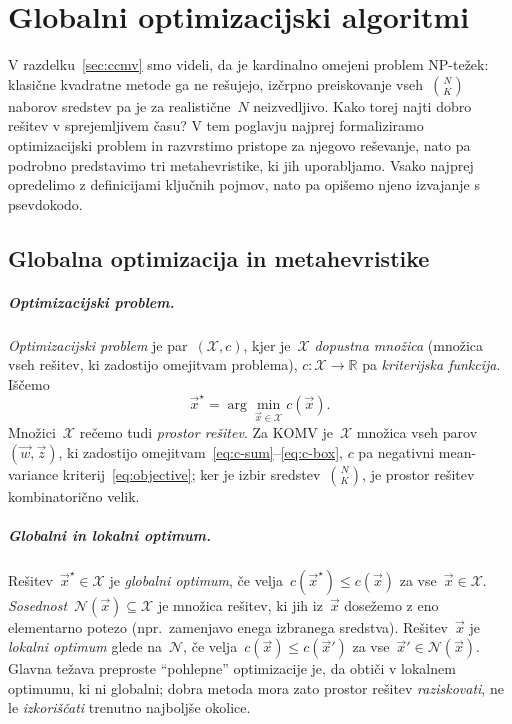 \chapter{Globalni optimizacijski algoritmi}
\label{ch:algoritmi}

V razdelku~\ref{sec:ccmv} smo videli, da je kardinalno omejeni problem NP-težek: klasične kvadratne metode ga ne rešujejo, izčrpno preiskovanje vseh~$\binom{N}{K}$ naborov sredstev pa je za realistične~$N$ neizvedljivo. Kako torej najti dobro rešitev v sprejemljivem času? V tem poglavju najprej formaliziramo optimizacijski problem in razvrstimo pristope za njegovo reševanje, nato pa podrobno predstavimo tri metahevristike, ki jih uporabljamo. Vsako najprej opredelimo z definicijami ključnih pojmov, nato pa opišemo njeno izvajanje s psevdokodo.

\section{Globalna optimizacija in metahevristike}
\label{sec:globalna}

\paragraph{Optimizacijski problem.} \emph{Optimizacijski problem} je par~$(\mathcal{X}, c)$, kjer je~$\mathcal{X}$ \emph{dopustna množica} (množica vseh rešitev, ki zadostijo omejitvam problema), $c:\mathcal{X}\to\mathbb{R}$ pa \emph{kriterijska funkcija}. Iščemo
\begin{equation}
\label{eq:optprob}
  \vec{x}^\star = \arg\min_{\vec{x}\in\mathcal{X}} c(\vec{x}).
\end{equation}
Množici~$\mathcal{X}$ rečemo tudi \emph{prostor rešitev}. Za KOMV je~$\mathcal{X}$ množica vseh parov~$(\vec{w},\vec{z})$, ki zadostijo omejitvam~\eqref{eq:c-sum}--\eqref{eq:c-box}, $c$ pa negativni mean-variance kriterij~\eqref{eq:objective}; ker je izbir sredstev~$\binom{N}{K}$, je prostor rešitev kombinatorično velik.

\paragraph{Globalni in lokalni optimum.} Rešitev~$\vec{x}^\star\in\mathcal{X}$ je \emph{globalni optimum}, če velja~$c(\vec{x}^\star)\le c(\vec{x})$ za vse~$\vec{x}\in\mathcal{X}$. \emph{Sosednost}~$\mathcal{N}(\vec{x})\subseteq\mathcal{X}$ je množica rešitev, ki jih iz~$\vec{x}$ dosežemo z eno elementarno potezo (npr.\ zamenjavo enega izbranega sredstva). Rešitev~$\vec{x}$ je \emph{lokalni optimum} glede na~$\mathcal{N}$, če velja~$c(\vec{x})\le c(\vec{x}')$ za vse~$\vec{x}'\in\mathcal{N}(\vec{x})$. Glavna težava preproste ``pohlepne'' optimizacije je, da obtiči v lokalnem optimumu, ki ni globalni; dobra metoda mora zato prostor rešitev \emph{raziskovati}, ne le \emph{izkoriščati} trenutno najboljše okolice.

